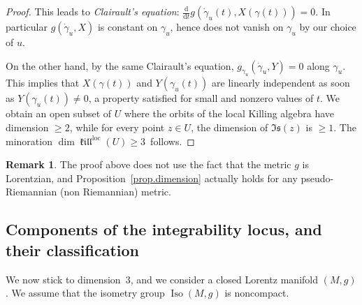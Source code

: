 \documentclass[11pt]{article}
\theoremstyle{definition}
\newtheorem{rema}[theo]{Remark}
\numberwithin{equation}{section}
\numberwithin{figure}{section}
\numberwithin{table}{section}
\DeclareMathOperator{\Iso}{Iso}
\DeclareMathOperator{\loc}{loc}
\DeclareMathOperator{\kil}{{\mathfrak{kill}}}
\newcommand{\kiloc}{\kil^{\loc}}
\newcommand*{\dd}{\mathrm{d}}
\newcommand*{\dt}{\dd t}
\begin{document}
\begin{proof}
This leads to \emph{Clairault's equation}: $\frac{\dd}{\dt}g(\dot{\gamma}_u(t),X(\gamma(t)))=0$. In particular $g(\dot{\gamma}_u,X)$ is constant on $\gamma_u$, hence does not vanish on $\gamma_u$ by our choice of $u$.

On the other hand, by the same Clairault's equation, $g_{\gamma_u}(\dot{\gamma}_u,Y) =0$ along $\gamma_u$. This implies that $X(\gamma(t))$ and $Y(\gamma_u(t))$ are linearly independent as soon as $Y(\gamma_u(t)) \not =0$, a property satisfied for small and nonzero values of $t$. We obtain an open subset of $U$ where the orbits of the local Killing algebra have dimension $\geq 2$, while for every point $z \in U$, the dimension of $\mathfrak{Is}(z)$ is $\geq 1$. The minoration $\dim \kiloc(U) \geq 3$~follows.
\end{proof}

\begin{rema}\label{rem.pseudoRiemannian}
The proof above does not use the fact that the metric $g$ is Lorentzian, and Proposition~\ref{prop.dimension} actually holds for any pseudo-Riemannian (non Riemannian) metric.
\end{rema}

\subsection{Components of the integrability locus, and their classification}
\label{sec.components}
We now stick to dimension~$3$, and we consider a closed Lorentz manifold $(M,g)$. We assume that the isometry group $\Iso(M,g)$ is noncompact.
\end{document}

